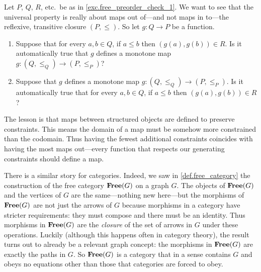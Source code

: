 \documentclass[7Sketches]{subfiles}
\begin{document}
\begin{exercise}%
\label{exc.free_preorder_check_2}
Let $P$, $Q$, $R$, etc.\ be as in \cref{exc.free_preorder_check_1}. We want to see that the universal property is really about maps out of---and not maps in to---the reflexive, transitive closure $(P,\leq)$. So let $g\colon Q\to P$ be a function.
\begin{enumerate}
	\item Suppose that for every $a,b\in Q$, if $a\leq b$ then $(g(a),g(b))\in R$. Is it automatically true that $g$ defines a monotone map $g\colon(Q,\leq_Q)\to(P,\leq_P)$?
	\item Suppose that $g$ defines a monotone map $g\colon(Q,\leq_Q)\to(P,\leq_P)$. Is it automatically true that for every $a,b\in Q$, if $a\leq b$ then $(g(a),g(b))\in R$?
\end{enumerate}
The lesson is that maps between structured objects are defined to preserve
constraints. This means the domain of a map must be somehow more constrained than the
codomain. Thus having the fewest additional constraints coincides with having
the most maps out---every function that respects our generating constraints
should define a map.%
\end{exercise}

\begin{example}%
%
There is a similar story for categories. Indeed, we saw in
\cref{def.free_category} the construction of the free category $\mathbf{Free}(G)$ on a
graph $G$. The objects of $\mathbf{Free}(G)$ and the vertices of $G$ are the
same---nothing new here---but the morphisms of $\mathbf{Free}(G)$ are not just the
arrows of $G$ because morphisms in a category have stricter requirements: they
must compose and there must be an identity. Thus morphisms in $\mathbf{Free}(G)$ are the
\emph{closure} of the set of arrows in $G$ under these operations. Luckily
(although this happens often in category theory), the result turns out to
already be a relevant graph concept: the morphisms in $\mathbf{Free}(G)$ are exactly the
paths in $G$. So $\mathbf{Free}(G)$ is a category that in a sense contains $G$ and obeys
no equations other than those that categories are forced to obey.
\end{example}
\end{document}

